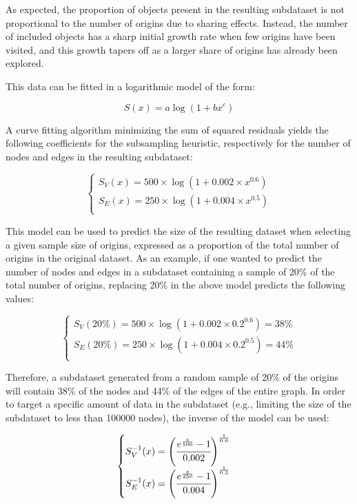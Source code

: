 As expected, the proportion of objects present in the resulting subdataset is
not proportional to the number of origins due to sharing effects. Instead,
the number of included objects has a sharp initial growth rate when few origins
have been visited, and this growth tapers off as a larger share of origins
has already been explored.

This data can be fitted in a logarithmic model of the form:

\[S(x) = a \log(1+bx^c)\]

A curve fitting algorithm minimizing the sum of squared residuals yields the
following coefficients for the subsampling heuristic, respectively for the
number of nodes and edges in the resulting subdataset:

\[
\begin{cases}
    S_V(x) = 500 \times \log(1 + 0.002 \times x ^{0.6}) \\
    S_E(x) = 250 \times \log(1 + 0.004 \times x ^{0.5}) \\
\end{cases}
\]

This model can be used to predict the size of the resulting dataset when
selecting a given sample size of origins, expressed as a proportion of the
total number of origins in the original dataset. As an example, if one wanted
to predict the number of nodes and edges in a subdataset containing a sample of
20\% of the total number of origins, replacing 20\% in the above model
predicts the following values:

\[
\begin{cases}
    S_V(20\%) = 500 \times \log(1 + 0.002 \times 0.2 ^{0.6}) = 38\% \\
    S_E(20\%) = 250 \times \log(1 + 0.004 \times 0.2 ^{0.5}) = 44\% \\
\end{cases}
\]

Therefore, a subdataset generated from a random sample of 20\% of the origins
will contain 38\% of the nodes and 44\% of the edges of the entire graph.
In order to target a specific amount of data in the subdataset (e.g., limiting
the size of the subdataset to less than \num{100000} nodes), the inverse of the
model can be used:

\[
\begin{cases}
    S_V^{-1}(x) = {\left(\cfrac{e^{\frac{x}{500}}-1}{0.002}\right)}^{\frac{1}{0.6}} \\
    S_E^{-1}(x) = {\left(\cfrac{e^{\frac{x}{250}}-1}{0.004}\right)}^{\frac{1}{0.5}} \\
\end{cases}
\]

